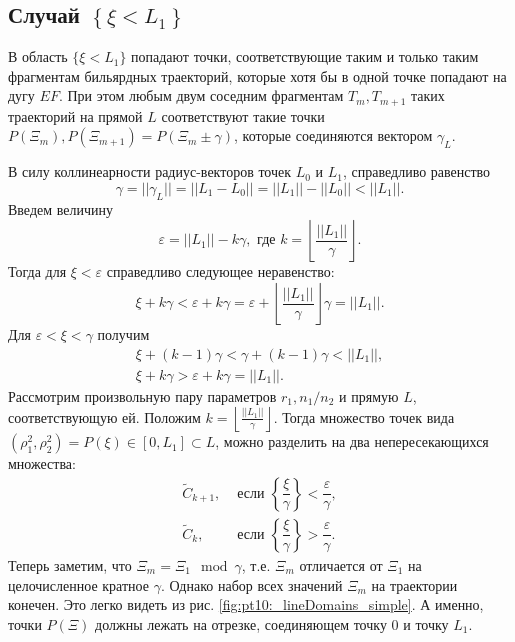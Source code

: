 
\subsection{Случай $\left\{\xi < L_1\right\}$}\label{sec:ch4/sec3/subsec3}

В область $\{ \xi < L_1\}$ попадают точки, соответствующие таким и только таким фрагментам бильярдных траекторий, которые хотя бы в одной точке попадают на дугу $EF$. 
При этом любым двум соседним фрагментам $T_m, T_{m+1}$ таких траекторий на прямой $L$ соответствуют такие точки $P(\Xi_m), P(\Xi_{m+1}) = P(\Xi_m \pm \gamma)$, которые соединяются вектором $\gamma_L$.

В силу коллинеарности радиус-векторов точек $L_0$ и $L_1$,  справедливо равенство 
$$\gamma = ||\gamma_L|| = ||L_1-L_0|| = ||L_1||-||L_0|| < ||L_1||.$$
Введем величину 
\begin{equation}
\varepsilon = ||L_1||  - k \gamma, \text{ где } k=\left \lfloor \frac{||L_1||}{\gamma} \right \rfloor.
\label{eq:kDef}
\end{equation}
Тогда для $\xi < \varepsilon$ справедливо следующее неравенство:
$$\xi + k \gamma < \varepsilon + k \gamma =
 \varepsilon + \left \lfloor \frac{||L_1||}{\gamma} \right \rfloor \gamma = ||L_1||.$$
Для $\varepsilon< \xi <\gamma$ получим
\[
\begin{array}{cc}
\xi + (k-1) \gamma  < \gamma + (k-1) \gamma < ||L_1||, \\
\xi + k \gamma  > \varepsilon + k \gamma =  ||L_1||.
\end{array}
\] 
Рассмотрим произвольную пару параметров $r_1, n_1/n_2$ и прямую $L$, соответствующую ей. Положим $k=\left \lfloor \frac{||L_1||}{\gamma} \right \rfloor$. Тогда множество точек вида $(\rho_1^2, \rho_2^2) = P(\xi) \in [0, L_1] \subset L$, можно разделить на два непересекающихся множества:
\begin{equation*}
\begin{array}{ll}
    \widetilde{C}_{k+1}, & \text{ если } \left\{\dfrac{\xi}{\gamma}\right\} < \dfrac{\varepsilon}{\gamma}, \\
    \widetilde{C}_k, & \text{ если } \left\{\dfrac{\xi}{\gamma}\right\} > \dfrac{\varepsilon}{\gamma}.
\end{array}
\end{equation*} 
Теперь заметим, что $\Xi_m = \Xi_1 \mod \gamma$,
т.е. $\Xi_m$ отличается от $\Xi_1$ на целочисленное кратное $\gamma$. Однако набор всех значений $\Xi_m$ на траектории конечен. Это легко видеть из рис.     \ref{fig:pt10:_lineDomains_simple}. А именно, точки $P(\Xi)$ должны лежать на отрезке, соединяющем точку $0$ и точку $L_1$.

